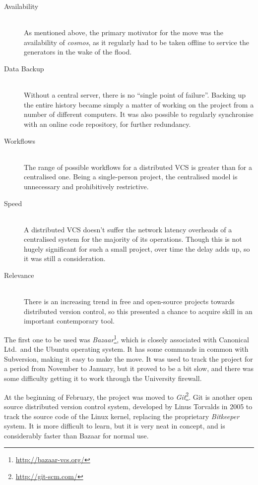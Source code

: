 \begin{description}
\item[Availability] \hfill \\
As mentioned above, the primary motivator for the move was the availability of
\emph{cosmos}, as it regularly had to be taken offline to service the generators
in the wake of the flood. 
\item[Data Backup] \hfill \\
Without a central server, there is no ``single point of failure''. Backing
up the entire history became simply a matter of working on the project from a
number of different computers. It was also possible to regularly synchronise
with an online code repository, for further redundancy.
\item[Workflows] \hfill \\
The range of possible workflows for a distributed VCS is greater than for a
centralised one. Being a single-person project, the centralised model is
unnecessary and prohibitively restrictive.
\item[Speed] \hfill \\
A distributed VCS doesn't suffer the network latency overheads of a centralised
system for the majority of its operations. Though this is not hugely significant
for such a small project, over time the delay adds up, so it was still a
consideration.
\item[Relevance] \hfill \\
There is an increasing trend in free and open-source projects towards
distributed version control, so this presented a chance to acquire skill in an
important contemporary tool.
\end{description}

The first one to be used was
\emph{Bazaar}\footnote{\url{http://bazaar-vcs.org/}}, which is closely
associated with Canonical Ltd.\ and the Ubuntu operating system. It has some
commands in common with Subversion, making it easy to make the move. It was used
to track the project for a period from November to January, but it proved to be
a bit slow, and there was some difficulty getting it to work through the
University firewall.

At the beginning of February, the project was moved to
\emph{Git}\footnote{\url{http://git-scm.com/}}. Git is another open source
distributed version control system, developed by Linus Torvalds in 2005 to track
the source code of the Linux kernel, replacing the proprietary \emph{Bitkeeper}
system. It is more difficult to learn, but it is very neat in concept, and is
considerably faster than Bazaar for normal use.

